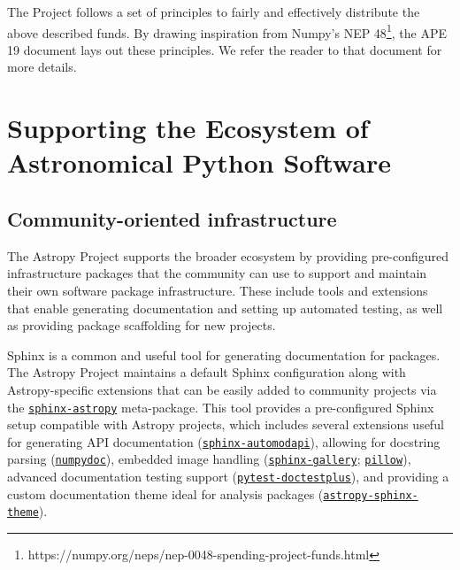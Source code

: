 \documentclass[modern]{aastex631}
\newcommand{\secauthor}[1]{{\color{blue}Author:~\textit{#1}}}
\begin{document}
The Project follows a set of principles to fairly and effectively
distribute the above described funds. By drawing inspiration from
Numpy's NEP 48\footnote{https://numpy.org/neps/nep-0048-spending-project-funds.html},
the APE 19 \citep{ape19} document lays out these principles. We refer the
reader to that document for more details.

\section{Supporting the Ecosystem of Astronomical Python Software}
\label{sec:ecosystem}

\subsection{Community-oriented infrastructure}


The Astropy Project supports the broader ecosystem by providing pre-configured
infrastructure packages that the community can use to support and maintain their
own software package infrastructure. These include tools and extensions that
enable generating documentation and setting up automated testing, as well
as providing package scaffolding for new projects.

Sphinx is a common and useful tool for generating documentation for \python
packages. The Astropy Project maintains a default Sphinx configuration along
with Astropy-specific extensions that can be easily added to community
projects via the
\href{https://github.com/astropy/sphinx-astropy}{\texttt{sphinx-astropy}}
meta-package. This tool provides a pre-configured Sphinx setup compatible with
Astropy projects, which includes several extensions useful for generating API
documentation
(\href{https://github.com/astropy/sphinx-automodapi}{\texttt{sphinx-automodapi}}),
allowing for  docstring parsing
(\href{https://github.com/numpy/numpydoc}{\texttt{numpydoc}}), embedded image
handling
(\href{https://github.com/sphinx-gallery/sphinx-gallery}{\texttt{sphinx-gallery}};
\href{https://github.com/python-pillow}{\texttt{pillow}}), advanced
documentation testing support
(\href{https://github.com/astropy/pytest-doctestplus}{\texttt{pytest-doctestplus}}),
and providing a custom documentation theme ideal for analysis packages
(\href{https://github.com/astropy/sphinx-astropy}{\texttt{astropy-sphinx-theme}}).
\end{document}

